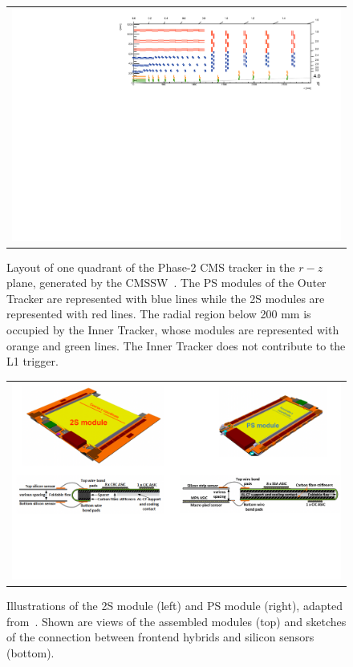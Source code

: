 \begin{figure}[tbh!]
 \begin{center}
 \begin{tabular}{c}
  \centering\includegraphics[width=0.9\linewidth]{figures/Part2/Upgrade/TrackerGeo}
 \end{tabular}
 \caption{Layout of one quadrant of the Phase-2 \ac{CMS} tracker in the $r-z$ plane, generated by the \ac{CMSSW}~\cite{cmssw}. The PS modules of the Outer Tracker are represented with blue lines while the 2S modules are represented with red lines. The radial region below 200 mm is occupied by the Inner Tracker, whose modules are represented with orange and green lines. The Inner Tracker does not contribute to the \ac{L1} trigger.}
 \label{fig:TrackerGeo}
 \end{center}
\end{figure}

\begin{figure}[tbh!]
 \begin{center}
 \begin{tabular}{c}
  \centering\includegraphics[width=0.95\linewidth]{figures/Part2/Upgrade/Modules}
 \end{tabular}
 \caption{Illustrations of the 2S module (left) and PS module (right), adapted from~\cite{CMS:2017lum}. Shown are views of the assembled modules (top) and sketches of the connection between frontend hybrids and silicon sensors (bottom).}
 \label{fig:Modules}
 \end{center}
\end{figure}

